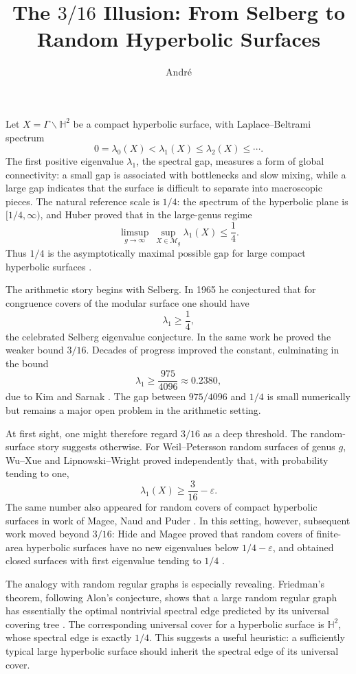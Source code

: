 \documentclass[9pt]{article}
\title{\textbf{The $3/16$ Illusion: From Selberg to Random Hyperbolic Surfaces}}
\author{Andr\'e}
\date{}
\begin{document}
\maketitle
\vspace{-1.6em}


Let $X=\Gamma\backslash\mathbb H^2$ be a compact hyperbolic surface, with Laplace--Beltrami spectrum
\[
0=\lambda_0(X)<\lambda_1(X)\leq\lambda_2(X)\leq\cdots.
\]
The first positive eigenvalue $\lambda_1$, the spectral gap, measures a form of global connectivity: a small gap is associated with bottlenecks and slow mixing, while a large gap indicates that the surface is difficult to separate into macroscopic pieces. The natural reference scale is $1/4$: the spectrum of the hyperbolic plane is $[1/4,\infty)$, and Huber proved that in the large-genus regime
\[
\limsup_{g\to\infty}\ \sup_{X\in\mathcal M_g}\lambda_1(X)\leq\frac14.
\]
Thus $1/4$ is the asymptotically maximal possible gap for large compact hyperbolic surfaces \cite{MonkNaud2026,Monk2026}.

The arithmetic story begins with Selberg. In 1965 he conjectured that for congruence covers of the modular surface one should have
\[
\lambda_1\geq\frac14,
\]
the celebrated Selberg eigenvalue conjecture. In the same work he proved the weaker bound $3/16$. Decades of progress improved the constant, culminating in the bound
\[
\lambda_1\geq\frac{975}{4096}\approx0.2380,
\]
due to Kim and Sarnak \cite{Selberg1965,KimSarnak2003}. The gap between $975/4096$ and $1/4$ is small numerically but remains a major open problem in the arithmetic setting.

At first sight, one might therefore regard $3/16$ as a deep threshold. The random-surface story suggests otherwise. For Weil--Petersson random surfaces of genus $g$, Wu--Xue and Lipnowski--Wright proved independently that, with probability tending to one,
\[
\lambda_1(X)\geq\frac{3}{16}-\varepsilon.
\]
The same number also appeared for random covers of compact hyperbolic surfaces in work of Magee, Naud and Puder \cite{WuXue2022,LipnowskiWright2024,MageeNaudPuder2022}. In this setting, however, subsequent work moved beyond $3/16$: Hide and Magee proved that random covers of finite-area hyperbolic surfaces have no new eigenvalues below $1/4-\varepsilon$, and obtained closed surfaces with first eigenvalue tending to $1/4$ \cite{HideMagee2023}.

The analogy with random regular graphs is especially revealing. Friedman's theorem, following Alon's conjecture, shows that a large random regular graph has essentially the optimal nontrivial spectral edge predicted by its universal covering tree \cite{Friedman2008}. The corresponding universal cover for a hyperbolic surface is $\mathbb H^2$, whose spectral edge is exactly $1/4$. This suggests a useful heuristic: a sufficiently typical large hyperbolic surface should inherit the spectral edge of its universal cover.
\end{document}
